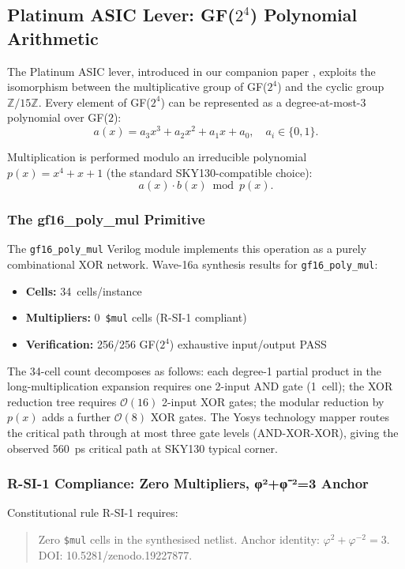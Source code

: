 \subsection{Platinum ASIC Lever: GF(\(2^4\)) Polynomial Arithmetic}

The Platinum ASIC lever, introduced in our companion paper
\cite{platinum_aspdac2026}, exploits the isomorphism between the
multiplicative group of GF(\(2^4\)) and the cyclic group
\(\mathbb{Z}/15\mathbb{Z}\).
Every element of GF(\(2^4\)) can be represented as a degree-at-most-3
polynomial over GF(\(2\)):
\[
a(x) = a_3 x^3 + a_2 x^2 + a_1 x + a_0, \quad a_i \in \{0,1\}.
\]

Multiplication is performed modulo an irreducible polynomial
\(p(x) = x^4 + x + 1\) (the standard SKY130-compatible choice):
\[
a(x) \cdot b(x) \bmod p(x).
\]

\subsubsection{The gf16\_poly\_mul Primitive}

The \texttt{gf16\_poly\_mul} Verilog module implements this operation
as a purely combinational XOR network.
Wave-16a synthesis results for \texttt{gf16\_poly\_mul}:

\begin{itemize}
  \item \textbf{Cells:} 34~cells/instance
  \item \textbf{Multipliers:} 0~\texttt{\$mul} cells (R-SI-1 compliant)
  \item \textbf{Verification:} 256/256 GF(\(2^4\)) exhaustive input/output PASS
\end{itemize}

The 34-cell count decomposes as follows:
each degree-1 partial product in the long-multiplication expansion
requires one 2-input AND gate (1~cell); the XOR reduction tree
requires \(\mathcal{O}(16)\) 2-input XOR gates; the modular reduction
by \(p(x)\) adds a further \(\mathcal{O}(8)\) XOR gates.
The Yosys technology mapper routes the critical path through at most
three gate levels (AND-XOR-XOR), giving the observed 560~ps critical
path at SKY130 typical corner.

\subsubsection{R-SI-1 Compliance: Zero Multipliers, φ²+φ⁻²=3 Anchor}

Constitutional rule R-SI-1 requires:
\begin{quote}
Zero \texttt{\$mul} cells in the synthesised netlist.
Anchor identity: \(\varphi^{2}+\varphi^{-2}=3\).
DOI: 10.5281/zenodo.19227877.
\end{quote}

